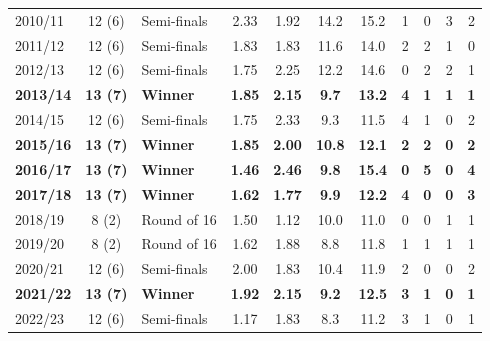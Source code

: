 \begin{table}[!h]
{\begin{threeparttable}
\begin{tabular}[t]{lclcccccccc}
\hspace{1em}2010/11 & 12 (6) & Semi-finals & 2.33 & 1.92 & 14.2 & 15.2 & 1 & 0 & 3 & 2\\
\hspace{1em}2011/12 & 12 (6) & Semi-finals & 1.83 & 1.83 & 11.6 & 14.0 & 2 & 2 & 1 & 0\\
\hspace{1em}2012/13 & 12 (6) & Semi-finals & 1.75 & 2.25 & 12.2 & 14.6 & 0 & 2 & 2 & 1\\
\textbf{\hspace{1em}2013/14} & \textbf{13 (7)} & \textbf{Winner} & \textbf{1.85} & \textbf{2.15} & \textbf{9.7} & \textbf{13.2} & \textbf{4} & \textbf{1} & \textbf{1} & \textbf{1}\\
\hspace{1em}2014/15 & 12 (6) & Semi-finals & 1.75 & 2.33 & 9.3 & 11.5 & 4 & 1 & 0 & 2\\
\textbf{\hspace{1em}2015/16} & \textbf{13 (7)} & \textbf{Winner} & \textbf{1.85} & \textbf{2.00} & \textbf{10.8} & \textbf{12.1} & \textbf{2} & \textbf{2} & \textbf{0} & \textbf{2}\\
\textbf{\hspace{1em}2016/17} & \textbf{13 (7)} & \textbf{Winner} & \textbf{1.46} & \textbf{2.46} & \textbf{9.8} & \textbf{15.4} & \textbf{0} & \textbf{5} & \textbf{0} & \textbf{4}\\
\textbf{\hspace{1em}2017/18} & \textbf{13 (7)} & \textbf{Winner} & \textbf{1.62} & \textbf{1.77} & \textbf{9.9} & \textbf{12.2} & \textbf{4} & \textbf{0} & \textbf{0} & \textbf{3}\\
\hspace{1em}2018/19 & 8 (2) & Round of 16 & 1.50 & 1.12 & 10.0 & 11.0 & 0 & 0 & 1 & 1\\
\hspace{1em}2019/20 & 8 (2) & Round of 16 & 1.62 & 1.88 & 8.8 & 11.8 & 1 & 1 & 1 & 1\\
\hspace{1em}2020/21 & 12 (6) & Semi-finals & 2.00 & 1.83 & 10.4 & 11.9 & 2 & 0 & 0 & 2\\
\textbf{\hspace{1em}2021/22} & \textbf{13 (7)} & \textbf{Winner} & \textbf{1.92} & \textbf{2.15} & \textbf{9.2} & \textbf{12.5} & \textbf{3} & \textbf{1} & \textbf{0} & \textbf{1}\\
\hspace{1em}2022/23 & 12 (6) & Semi-finals & 1.17 & 1.83 & 8.3 & 11.2 & 3 & 1 & 0 & 1\\

\end{tabular}
\end{threeparttable}}
\end{table}
